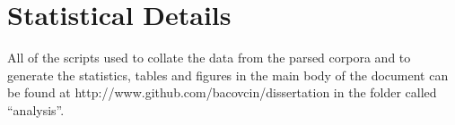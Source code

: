 \chapter{Statistical Details}
\label{app:stats}

All of the scripts used to collate the data from the parsed corpora and to generate the statistics, tables and figures in the main body of the document can be found at http://www.github.com/bacovcin/dissertation in the folder called ``analysis''.
